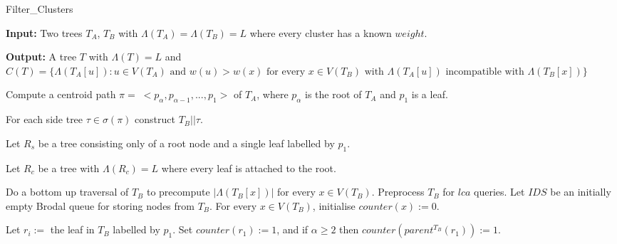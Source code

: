 \documentclass{article}
\begin{document}
    \begin{algorithm}
        \caption{Filter\_Clusters}
        \begin{algorithmic}[1]
            \State \textbf{Input:} Two trees $T_A$, $T_B$ with $\Lambda(T_A) = \Lambda(T_B) = L$ where every cluster has a known $weight$.

            \State \textbf{Output:} A tree $T$ with $\Lambda(T) = L$ and $C(T) = \{\Lambda(T_A[u]): u \in V(T_A) \text{ and } w(u) > w(x) \text{ for every } x \in V(T_B) \text{ with } \Lambda(T_A[u]) \text{ incompatible with } \Lambda(T_B[x])\}$

            \State Compute a centroid path $\pi = \;<p_{\alpha}, p_{\alpha - 1},...,p_1>$ of $T_A$, where $p_{\alpha}$ is the root of $T_A$ and $p_1$ is a leaf.

            \State For each side tree $\tau \in \sigma(\pi)$ construct $T_B||\tau$.

            \State Let $R_s$ be a tree consisting only of a root node and a single leaf labelled by $p_1$.

            \State Let $R_c$ be a tree with $\Lambda(R_c) = L$ where every leaf is attached to the root.

            \State Do a bottom up traversal of $T_B$ to precompute $|\Lambda(T_B[x])|$ for every $x \in V(T_B)$. Preprocess $T_B$ for $lca$ queries. Let $IDS$ be an initially empty Brodal queue for storing nodes from $T_B$. For every $x \in V(T_B)$, initialise $counter(x) := 0$.

            \State Let $r_i :=$ the leaf in $T_B$ labelled by $p_1$.\newline
            Set $counter(r_1) := 1$, and if $\alpha \geq 2$ then $counter(parent^{T_B}(r_1)) := 1$.


        \end{algorithmic}
    \end{algorithm}
\end{document}
